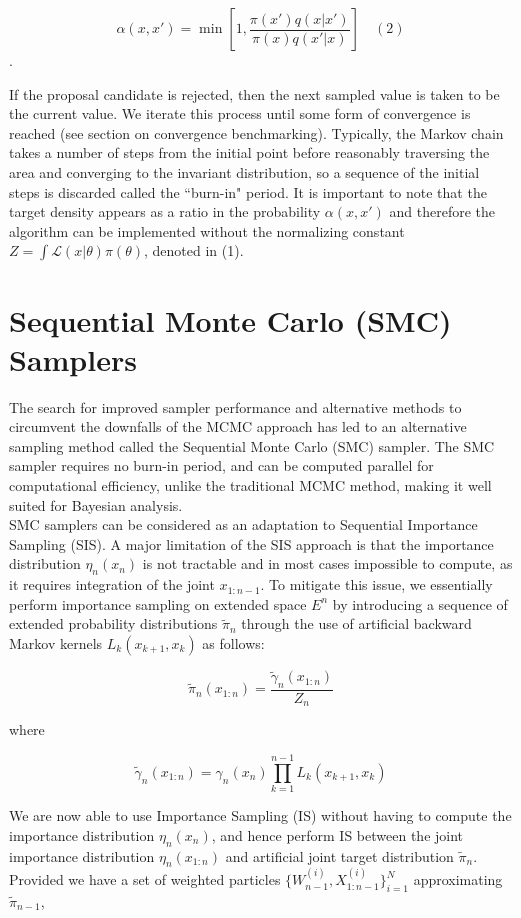 \documentclass[12pt]{elsarticle}
\begin{document}
\[
\alpha(x,x') = \min{\left[1, \frac{\pi(x') q(x|x')}{\pi(x)q(x'|x)}\right]} \quad (2)
\].

If the proposal candidate is rejected, then the next sampled value is taken to be the current value. We iterate this process until some form of convergence is reached (see section on convergence benchmarking). Typically, the Markov chain takes a number of steps from the initial point before reasonably traversing the area and converging to the invariant distribution, so a sequence of the initial steps is discarded called the ``burn-in" period. It is important to note that the target density appears as a ratio in the probability $ \alpha(x,x')$ and therefore the algorithm can be implemented without the normalizing constant $Z = \int \mathcal{L}(x|\theta)\pi(\theta)$, denoted in (1).

\section*{Sequential Monte Carlo (SMC) Samplers}
The search for improved sampler performance and alternative methods to circumvent the downfalls of the MCMC approach has led to an alternative sampling method called the Sequential Monte Carlo (SMC) sampler. The SMC sampler requires no burn-in period, and can be computed parallel for computational efficiency, unlike the traditional MCMC method, making it well suited for Bayesian analysis. \\

SMC samplers can be considered as an adaptation to Sequential Importance Sampling (SIS). A major limitation of the SIS approach is that the importance distribution $\eta_n(x_n)$ is not tractable and in most cases impossible to compute, as it requires integration of the joint $x_{1:n-1}$. To mitigate this issue,  we essentially perform importance sampling on extended space $E^n$ by introducing a sequence of extended probability distributions $\tilde{\pi}_n$ through the use of artificial backward Markov kernels $L_k(x_{k+1},x_k)$ as follows:

\[
\tilde{\pi}_n(x_{1:n}) = \frac{\tilde{\gamma}_n(x_{1:n})}{Z_n}
\]

where 

\[
\tilde{\gamma}_n(x_{1:n}) = \gamma_n(x_n) \prod_{k=1}^{n-1} L_k(x_{k+1},x_k)
\]

We are now able to use Importance Sampling (IS) without having to compute the importance distribution $\eta_n(x_n)$, and hence perform IS between the joint importance distribution $\eta_n(x_{1:n})$ and artificial joint target distribution $\tilde{\pi}_n$. Provided we have a set of weighted particles $\{W_{n-1}^{(i)}, X_{1:n-1}^{(i)}\}_{i=1}^N$ approximating $\tilde{\pi}_{n-1}$,
\end{document}

